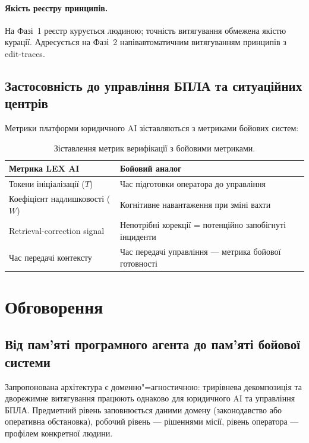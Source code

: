 \documentclass[11pt]{article}
\begin{document}
\paragraph{Якість реєстру принципів.}
На Фазі~1 реєстр курується людиною; точність витягування обмежена якістю курації.
Адресується на Фазі~2 напівавтоматичним витягуванням принципів з edit-traces.

\subsection{Застосовність до управління БПЛА та ситуаційних центрів}
\label{sec:metrics-mapping}

Метрики платформи юридичного AI зіставляються з метриками бойових систем:

\begin{table}[ht]
\centering
\caption{Зіставлення метрик верифікації з бойовими метриками.}
\label{tab:metrics-mapping}
\begin{tabular}{@{}p{5.5cm}p{5.5cm}@{}}
\toprule
\textbf{Метрика LEX AI} & \textbf{Бойовий аналог} \\
\midrule
Токени ініціалізації ($T$) & Час підготовки оператора до управління \\
Коефіцієнт надлишковості ($W$) & Когнітивне навантаження при зміні вахти \\
Retrieval-correction signal & Непотрібні корекції = потенційно запобігнуті інциденти \\
Час передачі контексту & Час передачі управління --- метрика бойової готовності \\
\bottomrule
\end{tabular}
\end{table}


\section{Обговорення}
\label{sec:discussion}

\subsection{Від пам'яті програмного агента до пам'яті бойової системи}

Запропонована архітектура є доменно"=агностичною: трирівнева декомпозиція та дворежимне витягування працюють однаково для юридичного AI та управління БПЛА.
Предметний рівень заповнюється даними домену (законодавство або оперативна обстановка), робочий рівень --- рішеннями місії, рівень оператора --- профілем конкретної людини.
\end{document}
